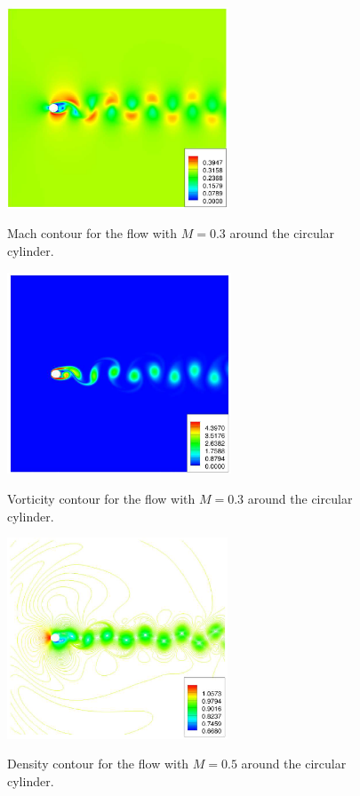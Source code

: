 \begin{figure}
\centering
\includegraphics[height=60mm]{figure_922a} \\
\caption{Mach contour for the flow with $M = 0.3$ around the circular cylinder.}
\label{fig:figure_922a}
\end{figure}

\begin{figure}
\centering
\includegraphics[height=60mm]{figure_922b} \\
\caption{Vorticity contour for the flow with $M = 0.3$ around the circular cylinder.}
\label{fig:figure_922b}
\end{figure}

\begin{figure}
\centering
\includegraphics[height=60mm]{figure_923a} \\
\caption{Density contour for the flow with $M = 0.5$ around the circular cylinder.}
\label{fig:figure_923a}
\end{figure}

